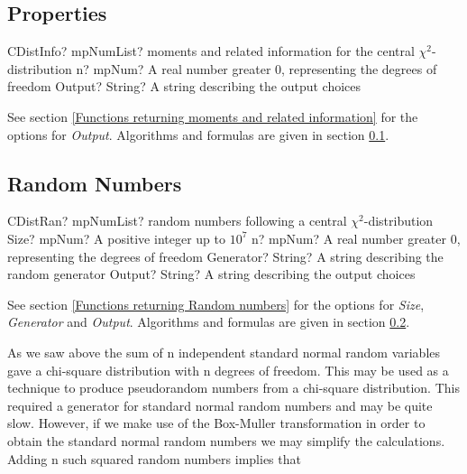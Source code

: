 \subsection{Properties}
\label{ChiSquareDistributionProperties}

\begin{mpFunctionsExtract}
	\mpFunctionTwo
	{CDistInfo? mpNumList? moments and related information for the central $\chi^2$-distribution}
	{n? mpNum? A real number greater 0, representing the degrees of freedom}
	{Output? String? A string describing the output choices}
\end{mpFunctionsExtract}

\vspace{0.3cm}

See section \ref{Functions returning moments and related information} for the options for {\itshape\sffamily Output}. Algorithms and formulas are given in section \ref{ChiSquareDistributionProperties}.






\subsection{Random Numbers}
\label{ChiSquareDistributionRandom}

\begin{mpFunctionsExtract}
	\mpFunctionFour
	{CDistRan? mpNumList? random numbers following a central $\chi^2$-distribution}
	{Size? mpNum? A positive integer up to $10^7$}
	{n? mpNum? A real number greater 0, representing the degrees of freedom}
	{Generator? String? A string describing the random generator}
	{Output? String? A string describing the output choices}
\end{mpFunctionsExtract}


\vspace{0.3cm}
See section \ref{Functions returning Random numbers} for the options for  {\itshape\sffamily Size},  {\itshape\sffamily Generator} and {\itshape\sffamily Output}. Algorithms and formulas are given in section \ref{ChiSquareDistributionRandom}.


\vspace{0.3cm}
As we saw above the sum of n independent standard normal random variables gave a
chi-square distribution with n degrees of freedom. This may be used as a technique to
produce pseudorandom numbers from a chi-square distribution. This required a generator
for standard normal random numbers and may be quite slow. However, if we make use of
the Box-Muller transformation in order to obtain the standard normal random numbers
we may simplify the calculations.
Adding n such squared random numbers implies that

